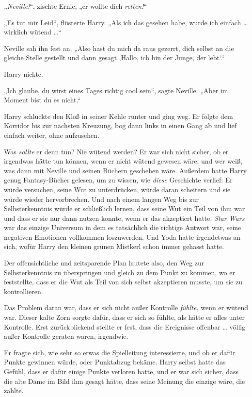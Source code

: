 {\emph{„Neville!}“, zischte Ernie, „er wollte dich \emph{retten!}“

„Es tut mir Leid“, flüsterte Harry. „Als ich das gesehen habe, wurde ich einfach … wirklich wütend …“

Neville sah ihn fest an. „Also hast du mich da raus gezerrt, dich selbst an die gleiche Stelle gestellt und dann gesagt ‚Hallo, ich bin der Junge, der lebt`.“

Harry nickte.

„Ich glaube, du wirst eines Tages richtig cool sein“, sagte Neville. „Aber im Moment bist du es nicht.“

Harry schluckte den Kloß in seiner Kehle runter und ging weg. Er folgte dem Korridor bis zur nächsten Kreuzung, bog dann links in einen Gang ab und lief einfach weiter, ohne aufzusehen.

Was \emph{sollte} er denn tun? Nie wütend werden? Er war sich nicht sicher, ob er irgendwas hätte tun können, wenn er nicht wütend gewesen wäre; und wer weiß, was dann mit Neville und seinen Büchern geschehen wäre. Außerdem hatte Harry genug Fantasy-Bücher gelesen, um zu wissen, wie \emph{diese} Geschichte verlief: Er würde versuchen, seine Wut zu unterdrücken, würde daran scheitern und sie würde wieder hervorbrechen. Und nach einem langen Weg bis zur Selbsterkenntnis würde er schließlich lernen, dass seine Wut ein Teil von ihm war und dass er sie nur dann nutzen konnte, wenn er das akzeptiert hatte. \emph{Star Wars} war das einzige Universum in dem es tatsächlich die richtige Antwort war, seine negativen Emotionen vollkommen loszuwerden. Und Yoda hatte irgendetwas an sich, wofür Harry den kleinen grünen Mistkerl schon immer gehasst hatte.

Der offensichtliche und zeitsparende Plan lautete also, den Weg zur Selbsterkenntnis zu überspringen und gleich zu dem Punkt zu kommen, wo er feststellte, dass er die Wut als Teil von sich selbst akzeptieren musste, um sie zu kontrollieren.

Das Problem daran war, dass er sich nicht außer Kontrolle \emph{fühlte,} wenn er wütend war. Dieser kalte Zorn sorgte dafür, dass er sich so fühlte, als hätte er alles unter Kontrolle. Erst zurückblickend stellte er fest, dass die Ereignisse offenbar … völlig außer Kontrolle geraten waren, irgendwie.

Er fragte sich, wie sehr so etwas die Spielleitung interessierte, und ob er dafür Punkte gewinnen würde, oder Punktabzug bekäme. Harry selbst hatte das Gefühl, dass er dafür einige Punkte verloren hatte, und er war sich sicher, dass die alte Dame im Bild ihm gesagt hätte, dass seine Meinung die einzige wäre, die zählte.

}
